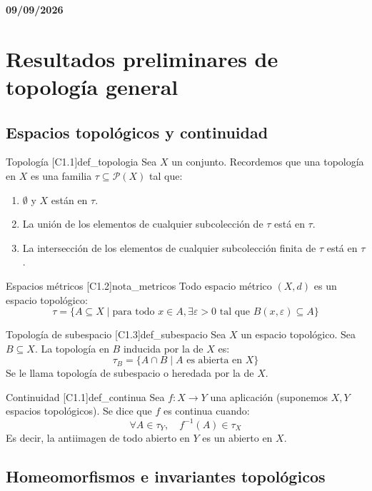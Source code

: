\textbf{09/09/2026}

\section{Resultados preliminares de topología general}


\subsection{Espacios topológicos y continuidad}

\begin{definicion}{Topología [C1.1]}{def_topologia}
Sea $X$ un conjunto. Recordemos que una topología en $X$ es una familia $\tau \subseteq \mathcal{P}(X)$ tal que:
\begin{enumerate}
    \item $\emptyset$ y $X$ están en $\tau$.
    \item La unión de los elementos de cualquier subcolección de $\tau$ está en $\tau$.
    \item La intersección de los elementos de cualquier subcolección finita de $\tau$ está en $\tau$.
\end{enumerate}
\end{definicion}

\begin{nota}{Espacios métricos [C1.2]}{nota_metricos}
Todo espacio métrico $(X, d)$ es un espacio topológico:
\[ \tau = \{A \subseteq X \mid \text{para todo } x \in A, \exists \varepsilon > 0 \text{ tal que } B(x, \varepsilon) \subseteq A\} \]
\end{nota}

\begin{definicion}{Topología de subespacio [C1.3]}{def_subespacio}
Sea $X$ un espacio topológico. Sea $B \subseteq X$. La topología en $B$ inducida por la de $X$ es:
\[ \tau_B = \{A \cap B \mid A \text{ es abierta en } X\} \]
Se le llama topología de subespacio o heredada por la de $X$.
\end{definicion}

\begin{definicion}{Continuidad [C1.1]}{def_continua}
Sea $f \colon X \to Y$ una aplicación (suponemos $X, Y$ espacios topológicos). Se dice que $f$ es continua cuando:
\[ \forall A \in \tau_Y, \quad f^{-1}(A) \in \tau_X \]
Es decir, la antiimagen de todo abierto en $Y$ es un abierto en $X$.
\end{definicion}

\subsection{Homeomorfismos e invariantes topológicos}

